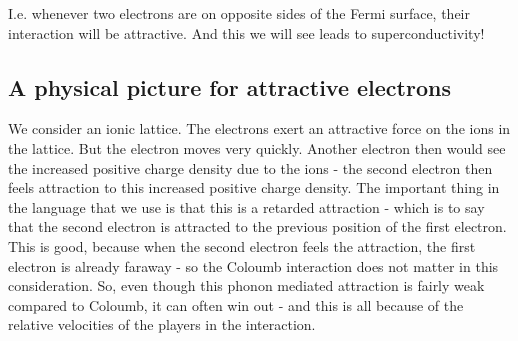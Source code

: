 I.e. whenever two electrons are on opposite sides of the Fermi surface, their interaction will be attractive. And this we will see leads to superconductivity!

\subsection{A physical picture for attractive electrons}
We consider an ionic lattice. The electrons exert an attractive force on the ions in the lattice. But the electron moves very quickly. Another electron then would see the increased positive charge density due to the ions - the second electron then feels attraction to this increased positive charge density. The important thing in the language that we use is that this is a retarded attraction - which is to say that the second electron is attracted to the previous position of the first electron. This is good, because when the second electron feels the attraction, the first electron is already faraway - so the Coloumb interaction does not matter in this consideration. So, even though this phonon mediated attraction is fairly weak compared to Coloumb, it can often win out - and this is all because of the relative velocities of the players in the interaction.

